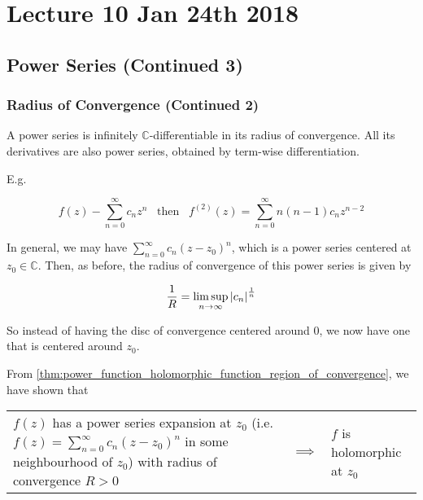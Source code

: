 \documentclass[notoc,notitlepage]{tufte-book}
\begin{document}



\chapter{Lecture 10 Jan 24th 2018}
	\label{chapter:lecture_10_jan_24th_2018}

\section{Power Series (Continued 3)} %
\label{sec:power_series_continued_3}

\subsection{Radius of Convergence (Continued 2)} %
\label{sub:radius_of_convergence_continued_2}

A power series is infinitely $\mathbb{C}$-differentiable in its radius of convergence. All its derivatives are also power series, obtained by term-wise differentiation.

E.g.

\begin{equation*}
	f(z) - \sum_{n=0}^{\infty} c_n z^n \enspace \text{ then } \enspace f^{(2)}(z) = \sum_{n=0}^{\infty} n(n-1)c_n z^{n - 2}
\end{equation*}

In general, we may have $\sum_{n=0}^{\infty} c_n (z - z_0)^n$, which is a power series centered at $z_0 \in \mathbb{C}$. Then, as before, the radius of convergence of this power series is given by

\begin{equation*}
	\frac{1}{R} = \limsup_{n \to \infty} \left|c_n\right|^\frac{1}{n}
\end{equation*}

So instead of having the disc of convergence centered around $0$, we now have one that is centered around $z_0$.

\begin{crly}
	From \cref{thm:power_function_holomorphic_function_region_of_convergence}, we have shown that

	\begin{tabular}{L{7cm} C{2cm} R{5cm}}
		$f(z)$ has a power series expansion at $z_0$ (i.e. $f(z) = \sum_{n=0}^\infty c_n (z - z_0)^n$ in some neighbourhood of $z_0$) with radius of convergence $R > 0$ &
		$\implies$ &
		$f$ is holomorphic at $z_0$
	\end{tabular}
\end{crly}
\end{document}
